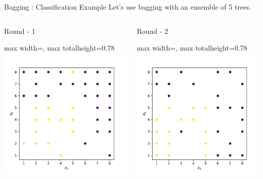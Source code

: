 \documentclass[aspectratio=169,10pt]{beamer}
\newcommand{\fitpic}[1]{\begin{adjustbox}{max width=\linewidth, max totalheight=0.78\textheight}#1\end{adjustbox}}
\begin{document}
\begin{frame}{Bagging : Classification Example}
  Let's use bagging with an ensemble of 5 trees.\\[0.3cm]
  \begin{columns}
    \pause\begin{column}{0.33\textwidth}\centering
      Round - 1\\
      \fitpic{\includegraphics[width=\linewidth]{../assets/ensemble/figures/dataset-rnd-0}}
    \end{column}
    \pause\begin{column}{0.33\textwidth}\centering
      Round - 2\\
      \fitpic{\includegraphics[width=\linewidth]{../assets/ensemble/figures/dataset-rnd-1}}

\end{column}
\end{columns}
\end{frame}
\end{document}
